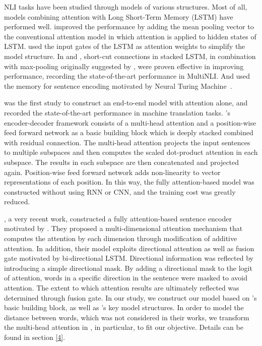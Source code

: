 \documentclass[11pt,letterpaper]{article}
\begin{document}
NLI tasks have been studied through models of various structures. Most of all, models combining attention with Long Short-Term Memory (LSTM) have performed well. \citet{NLI_INNER} improved the performance by adding the mean pooling vector to the conventional attention model in which attention is applied to hidden states of LSTM. \citet{NLI_GATE} used the input gates of the LSTM as attention weights to simplify the model structure. In \citet{NLI_GATE} and \citet{MultiNLI_STACK}, short-cut connections in stacked LSTM, in combination with max-pooling originally suggested by \citet{Facebook}, were proven effective in improving performance, recording the state-of-the-art performance in MultiNLI. And \citet{NLI_NSE} used the memory for sentence encoding motivated by Neural Turing Machine~\citep{NTM}.

\citet{AttentionAYN} was the first study to construct an end-to-end model with attention alone, and recorded the state-of-the-art performance in machine translation tasks. \citet{AttentionAYN}'s encoder-decoder framework consists of a multi-head attention and a position-wise feed forward network as a basic building block which is deeply stacked combined with residual connection. The multi-head attention projects the input sentences to multiple subspaces and then computes the scaled dot-product attention in each subspace. The results in each subspace are then concatenated and projected again. Position-wise feed forward network adds non-linearity to vector representations of each position. In this way, the fully attention-based model was constructed without using RNN or CNN, and the training cost was greatly reduced. 
 
\citet{DiSAN}, a very recent work, constructed a fully attention-based sentence encoder motivated by \citet{AttentionAYN}. They proposed a multi-dimensional attention mechanism that computes the attention by each dimension through modification of additive attention. In addition, their model exploits directional attention as well as fusion gate motivated by bi-directional LSTM. Directional information was reflected by introducing a simple directional mask. By adding a directional mask to the logit of attention, words in a specific direction in the sentence were masked to avoid attention. The extent to which attention results are ultimately reflected was determined through fusion gate. In our study, we construct our model based on \citet{AttentionAYN}'s basic building block, as well as \citet{DiSAN}'s key model structures. In order to model the distance between words, which was not considered in their works, we transform the multi-head attention in \citet{AttentionAYN}, in particular, to fit our objective. Details can be found in section \ref{4}.
\end{document}
